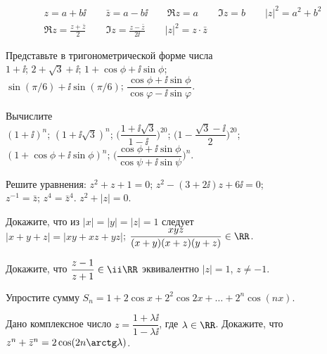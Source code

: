 

\begin{gather*}
    z = a + b \ii
\qquad
    \bar z = a - b \ii
\qquad
    \Re z = a
\qquad
    \Im z = b
\qquad
    |z|^2 = a^2 + b^2
\\
    \Re z = \frac{z + \bar z}{2}
\qquad
    \Im z = \frac{z - \bar z}{2 \ii}
\qquad
    |z|^2 = z \cdot \bar z
\end{gather*}

\begin{problems}

\item
Представьте в тригонометрической форме числа
\\
\sbp $1 + \ii$;
\quad
\sbp $2 + \sqrt{3} + \ii$;
\quad
\sbp $1 + \cos \phi + \ii \sin \phi$;
\\[1ex]
\sbp $\sin(\pi / 6) + \ii \sin(\pi / 6)$;
\quad
\sbp $\dfrac{\cos \phi + \ii \sin \phi}{\cos \varphi - \ii \sin \varphi}$.

\item
Вычислите
\\
\sbp $(1 + \ii)^n$;
\quad
\sbp $(1 + \ii \sqrt{3})^n$;
\quad
\sbp $\biggl(\dfrac{1 + \ii \sqrt{3}}{1 - \ii}\biggr)^{20}$;
\quad
\sbp $\biggl(1 - \dfrac{\sqrt{3} - \ii}{2}\biggr)^{20}$;
\\[1ex]
\sbp $(1 + \cos \phi + \ii \sin \phi)^n$;
\quad
\sbp
\(
    \biggl(
        \dfrac{\cos \phi + \ii \sin \phi}{\cos \psi + \ii \sin \psi}
    \biggr)^n
\).

\item
Решите уравнения:
\quad
\sbp $z^2 + z + 1 = 0$;
\quad
\sbp $z^2 - (3 + 2 \ii) z + 6 \ii = 0$;
\\
\sbp $z^{-1} = \bar z$;
\quad
\sbp $z^4 = \bar z^4$.
\quad
\sbp $z^2 + |z| = 0$.

\item
Докажите, что из
$|x| = |y| = |z| = 1$
следует
\\
\sbp $|x + y + z| = |x y + x z + y z|$;
\quad
\sbp $\dfrac{x y z}{(x + y) (x + z) (y + z)} \in \RR$.

\item
Докажите, что
$\dfrac{z - 1}{z + 1} \in \ii \RR$
эквивалентно
$|z| = 1$, $z \not= -1$.

\item
Упростите сумму
$S_n = 1 + 2 \cos x + 2^2 \cos 2 x + \ldots + 2^n \cos(n x)$.

\item
Дано комплексное число
\(
    z
=
    \dfrac{1 + \lambda \ii}{1 - \lambda \ii}
\),
где $\lambda \in \RR$.
Докажите, что $z^n + \bar z^n = 2 \cos(2 n \arctg \lambda)$.


\end{problems}
